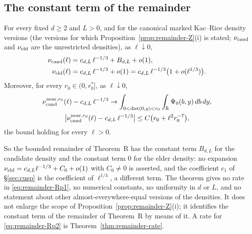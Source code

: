 \subsection{The constant term of the remainder}\label{ssec:remainder-vanish}

\begin{theorem}\label{thm:remainder-vanish}
For every fixed $d\ge2$ and $L>0$, and for the canonical marked Kac--Rice density versions (the versions for which Proposition~\ref{prop:remainder-Z}(i) is stated; $\nu_{\mathrm{cand}}$ and $\nu_{\mathrm{eld}}$ are the unrestricted densities), as $\ell\downarrow0$,
\begin{align}
\nu_{\mathrm{cand}}(\ell)&=c_{d,L}\,\ell^{-1/3}+B_{d,L}+o(1),\label{eq:remainder-Rp1}\\
\nu_{\mathrm{eld}}(\ell)&=c_{d,L}\,\ell^{-1/3}+o(1)=c_{d,L}\,\ell^{-1/3}\bigl(1+o(\ell^{1/3})\bigr).\label{eq:remainder-Rp2}
\end{align}
Moreover, for every $r_0\in(0,r_0^*]$, as $\ell\downarrow0$,
\begin{equation}\label{eq:remainder-Rp3}
\begin{gathered}
\nu_{\mathrm{cand}}^{\mathrm{near},r_0}(\ell)-c_{d,L}\,\ell^{-1/3}\to\int_{0<\operatorname{dist}(0,y)<r_0}\int_\mathbb R\Psi_0(b,y)\,db\,dy,\\
\bigl|\nu_{\mathrm{cand}}^{\mathrm{near},r_0}(\ell)-c_{d,L}\,\ell^{-1/3}\bigr|\le C\bigl(r_0+\ell^2r_0^{-7}\bigr),
\end{gathered}
\end{equation}
the bound holding for every $\ell>0$.
\end{theorem}

So the bounded remainder of Theorem~R has the constant term $B_{d,L}$ for the candidate density and the constant term $0$ for the elder density: no expansion $\nu_{\mathrm{eld}}=c_{d,L}\ell^{-1/3}+C_0+o(1)$ with $C_0\ne0$ is asserted, and the coefficient $c_1$ of \S\ref{sec:cusp} is the coefficient of $\ell^{1/4}$, a different term. The theorem gives no rate in \eqref{eq:remainder-Rp1}, no numerical constants, no uniformity in $d$ or $L$, and no statement about other almost-everywhere-equal versions of the densities. It does not enlarge the scope of Proposition~\ref{prop:remainder-Z}(i); it identifies the constant term of the remainder of Theorem~R by means of it. A rate for \eqref{eq:remainder-Rp2} is Theorem~\ref{thm:remainder-rate}.

